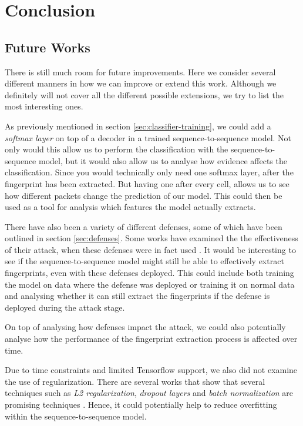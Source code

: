

\chapter{Conclusion}


\section{Future Works}

There is still much room for future improvements.
Here we consider several different manners in how we can improve or extend this work.
Although we definitely will not cover all the different possible extensions, we try to list the most interesting ones.

As previously mentioned in section \ref{sec:classifier-training}, we could add a \textit{softmax layer} on top of a decoder in a trained sequence-to-sequence model.
Not only would this allow us to perform the classification with the sequence-to-sequence model, but it would also allow us to analyse how evidence affects the classification.
Since you would technically only need one softmax layer, after the fingerprint has been extracted.
But having one after every cell, allows us to see how different packets change the prediction of our model.
This could then be used as a tool for analysis which features the model actually extracts.

There have also been a variety of different defenses, some of which have been outlined in section \ref{sec:defenses}.
Some works have examined the the effectiveness of their attack, when these defenses were in fact used \cite{kfingerprinting,wang_cai_johnson_nithyanand_goldberg_2014}.
It would be interesting to see if the sequence-to-sequence model might still be able to effectively extract fingerprints, even with these defenses deployed.
This could include both training the model on data where the defense was deployed or training it on normal data and analysing whether it can still extract the fingerprints if the defense is deployed during the attack stage.

On top of analysing how defenses impact the attack, we could also potentially analyse how the performance of the fingerprint extraction process is affected over time.

Due to time constraints and limited Tensorflow support, we also did not examine the use of regularization.
There are several works that show that several techniques such as \textit{L2 regularization}, \textit{dropout layers} and \textit{batch normalization} are promising techniques \cite{ioffe2015batch,nielsen_2017}.
Hence, it could potentially help to reduce overfitting within the sequence-to-sequence model.



